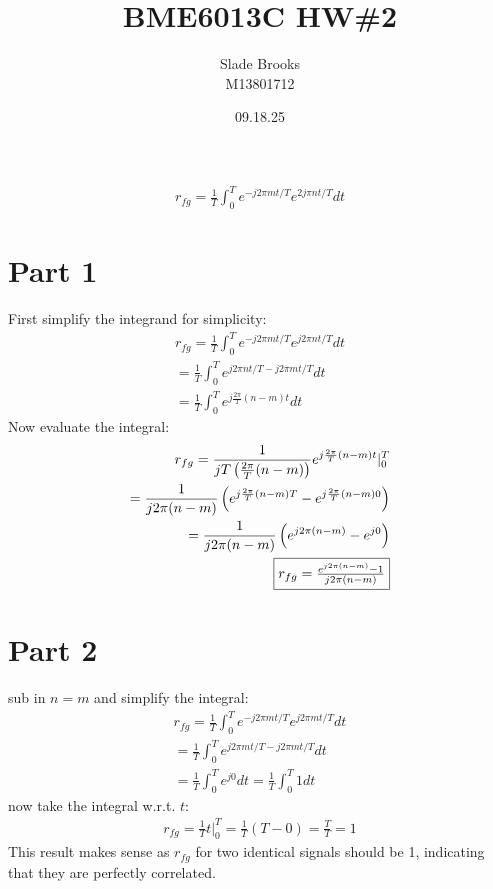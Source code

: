 \documentclass[12 pt]{article}
\title{BME6013C HW\#2}
\date{09.18.25}
\author{Slade Brooks \\ M13801712}
\begin{document}
\maketitle

\begin{align*}
    r_{fg}=\frac{1}{T}\int_{0}^{T}e^{-j2\pi mt/T}e^{2j\pi nt/T}dt
\end{align*}

\section*{Part 1}
First simplify the integrand for simplicity:
\begin{align*}
    r_{fg}=\frac{1}{T}\int_{0}^{T}e^{-j2\pi mt/T}e^{j2\pi nt/T}dt \\
    =\frac{1}{T}\int_{0}^{T}e^{j2\pi n t/T -j2\pi mt/T}dt \\
    =\frac{1}{T}\int_{0}^{T}e^{j\frac{2\pi}{T}(n - m)t}dt
\end{align*}
Now evaluate the integral:
\begin{align*}
    r_{fg}=\frac{1}{jT\left(\frac{2\pi}{T}(n - m)\right)}e^{j\frac{2\pi}{T}(n - m)t}|_0^T \\
    =\frac{1}{j2\pi(n - m)}\left(e^{j\frac{2\pi}{T}(n-m)T}-e^{j\frac{2\pi}{T}(n-m)0}\right) \\
    =\frac{1}{j2\pi(n - m)}\left(e^{j2\pi(n-m)}-e^{j0}\right) \\
    \fbox{$r_{fg}=\frac{e^{j2\pi(n - m)}-1}{j2\pi(n - m)}$}
\end{align*}

\section*{Part 2}
sub in $n=m$ and simplify the integral:
\begin{align*}
    r_{fg}=\frac{1}{T}\int_{0}^{T}e^{-j2\pi mt/T}e^{j2\pi mt/T}dt \\
    =\frac{1}{T}\int_{0}^{T}e^{j2\pi mt/T -j2\pi mt/T}dt \\
    =\frac{1}{T}\int_{0}^{T}e^{j0}dt=\frac{1}{T}\int_{0}^{T}1dt
\end{align*}
now take the integral w.r.t. $t$:
\begin{align*}
    r_{fg}=\frac{1}{T}t|_0^T=\frac{1}{T}(T - 0)=\frac{T}{T}=1
\end{align*}
This result makes sense as $r_{fg}$ for two identical signals should be 1, indicating that they are perfectly
correlated.
\end{document}
